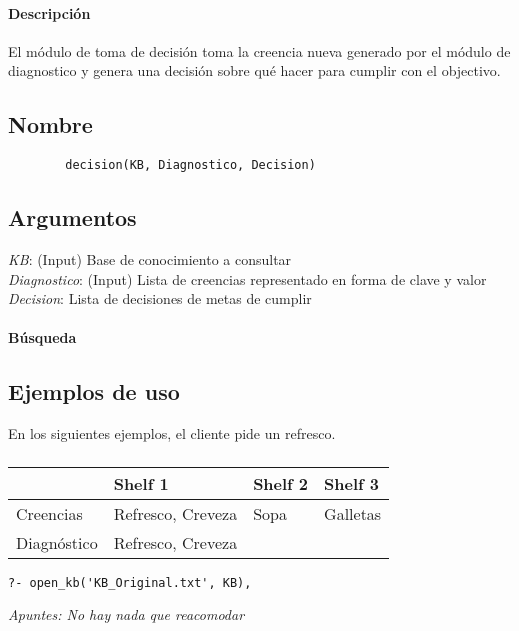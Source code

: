 \documentclass[11pt,fleqn]{article}
\begin{document}
\paragraph{Descripción} El módulo de toma de decisión toma la creencia nueva generado por el módulo de diagnostico y genera una decisión sobre qué hacer para cumplir con el objectivo.

\subsection*{Nombre}
	\begin{verbatim}
		decision(KB, Diagnostico, Decision)
	\end{verbatim}

\subsection*{Argumentos}
	\textit{KB}: (Input) Base de conocimiento a consultar \\
	\textit{Diagnostico}: (Input) Lista de creencias representado en forma de clave y valor \\
	\textit{Decision}: Lista de decisiones de metas de cumplir 

\paragraph{Búsqueda} 

\subsection*{Ejemplos de uso}

En los siguientes ejemplos, el cliente pide un refresco.

\subsubsection{}
	\begin{tabular}{| l | l | l | l |}
		\hline
						& Shelf 1 & Shelf 2 & Shelf 3 \\ \hline
		Creencias		& Refresco, Creveza & Sopa & Galletas \\ \hline
		Diagnóstico		& Refresco, Creveza & & \\
		\hline
	\end{tabular}
	\begin{lstlisting}
?- open_kb('KB_Original.txt', KB), 
	\end{lstlisting}
	\textit{Apuntes: No hay nada que reacomodar}
\end{document}
